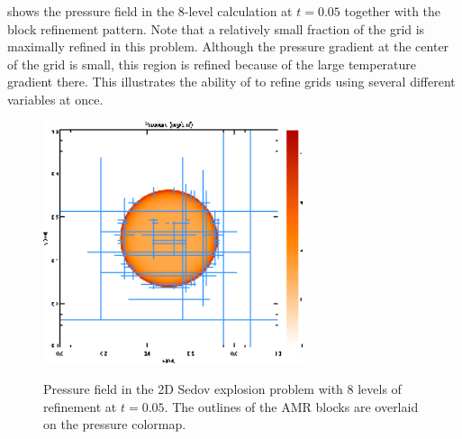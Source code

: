  shows the pressure field in the
8-level calculation at $t=0.05$ together with the block refinement
pattern. Note that a relatively small fraction of the grid is
maximally refined in this problem. Although the pressure gradient at
the center of the grid is small, this region is refined because of
the large temperature gradient there. This illustrates the ability
of \Paramesh to refine grids using several different variables at
once.
\begin{figure}[!ht]
\begin{center}
{\leavevmode\includegraphics[width=3in]{Sedov_pressure}}
\end{center}
\caption{\label{Fig:Sedov refinement} Pressure field in the
2D Sedov explosion problem with 8 levels of refinement at $t=0.05$.
The outlines of the AMR blocks are overlaid on the pressure colormap.
}
\end{figure}


%

